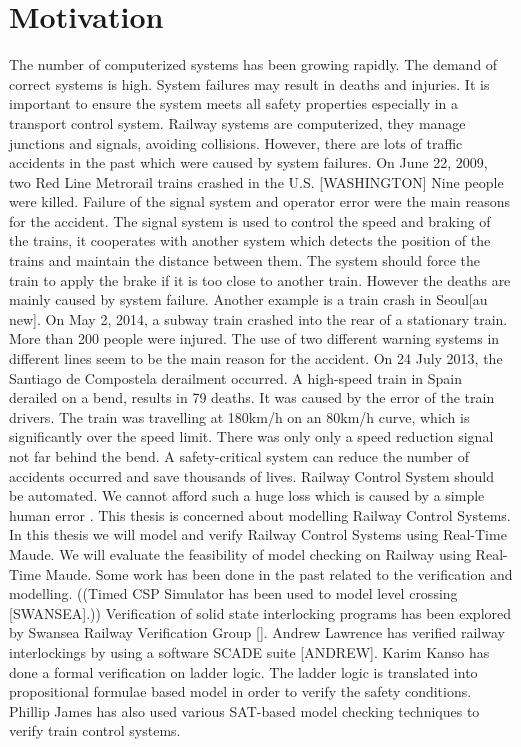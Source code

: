\documentclass{report}
\begin{document}
\section{Motivation}
The number of computerized systems has been growing rapidly. The demand of correct systems is high. System failures may result in deaths and injuries. It is important to ensure the system meets all safety properties especially in a transport control system. Railway systems are computerized, they manage junctions and signals, avoiding collisions. However, there are lots of traffic accidents in the past which were caused by system failures. On June 22, 2009, two Red Line Metrorail trains crashed in the U.S. [WASHINGTON] Nine people were killed. Failure of the signal system and operator error were the main reasons for the accident. The signal system is used to control the speed and braking of the trains, it cooperates with another system which detects the position of the trains and maintain the distance between them. The system should force the train to apply the brake if it is too close to another train. However the deaths are mainly caused by system failure. Another example is a train crash in Seoul[au new]. On May 2, 2014, a subway train crashed into the rear of a stationary train. More than 200 people were injured. The use of two different warning systems in different lines seem to be the main reason for the accident. On 24 July 2013, the Santiago de Compostela derailment occurred. A high-speed train in Spain derailed on a bend, results in 79 deaths. It was caused by the error of the train drivers. The train was travelling at 180km/h on an 80km/h curve, which is significantly over the speed limit. There was only only a speed reduction signal not far behind the bend. A safety-critical system can reduce the number of accidents occurred and save thousands of lives. Railway Control System should be automated. We cannot afford such a huge loss which is caused by a simple human error . \newline \newline
This thesis is concerned about modelling Railway Control Systems. In this thesis we will model and verify Railway Control Systems using Real-Time Maude. We will evaluate the feasibility of model checking on Railway using Real-Time Maude. Some work has been done in the past related to the verification and modelling. ((Timed CSP Simulator has been used to model level crossing [SWANSEA].)) Verification of solid state interlocking programs has been explored by Swansea Railway Verification Group []. Andrew Lawrence has verified railway interlockings by using a software SCADE suite [ANDREW]. Karim Kanso has done a formal verification on ladder logic. The ladder logic is translated into propositional formulae based model in order to verify the safety conditions. Phillip James has also used various SAT-based model checking techniques to verify train control systems.  
\end{document}
